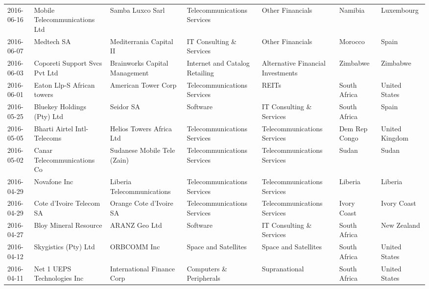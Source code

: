 \documentclass[11pt]{article}
\begin{document}
\begin{tabular}{lllllll}
	 2016-06-16 & Mobile Telecommunications Ltd  & Samba Luxco Sarl               & Telecommunications Services    & Other Financials                  & Namibia       & Luxembourg    \\
	 2016-06-07 & Medtech SA                     & Mediterrania Capital II        & IT Consulting \& Services       & Other Financials                  & Morocco       & Spain         \\
	 2016-06-03 & Coporeti Support Svcs Pvt Ltd  & Brainworks Capital Management  & Internet and Catalog Retailing & Alternative Financial Investments & Zimbabwe      & Zimbabwe      \\
	 2016-06-01 & Eaton Llp-S African towers     & American Tower Corp            & Telecommunications Services    & REITs                             & South Africa  & United States \\
	 2016-05-25 & Bluekey Holdings (Pty) Ltd     & Seidor SA                      & Software                       & IT Consulting \& Services          & South Africa  & Spain         \\
	 2016-05-05 & Bharti Airtel Intl-Telecoms    & Helios Towers Africa Ltd       & Telecommunications Services    & Telecommunications Services       & Dem Rep Congo & United Kingdom\\
	 2016-05-02 & Canar Telecommunications Co    & Sudanese Mobile Tele (Zain)    & Telecommunications Services    & Telecommunications Services       & Sudan         & Sudan         \\
	 2016-04-29 & Novafone Inc                   & Liberia Telecommunications     & Telecommunications Services    & Telecommunications Services       & Liberia       & Liberia       \\
	 2016-04-29 & Cote d'Ivoire Telecom SA       & Orange Cote d'Ivoire SA        & Telecommunications Services    & Telecommunications Services       & Ivory Coast   & Ivory Coast   \\
	 2016-04-27 & Bloy Mineral Resource          & ARANZ Geo Ltd                  & Software                       & IT Consulting \& Services          & South Africa  & New Zealand   \\
	 2016-04-12 & Skygistics (Pty) Ltd           & ORBCOMM Inc                    & Space and Satellites           & Space and Satellites              & South Africa  & United States \\
	 2016-04-11 & Net 1 UEPS Technologies Inc    & International Finance Corp     & Computers \& Peripherals        & Supranational                     & South Africa  & United States \\

\end{tabular}
\end{document}
